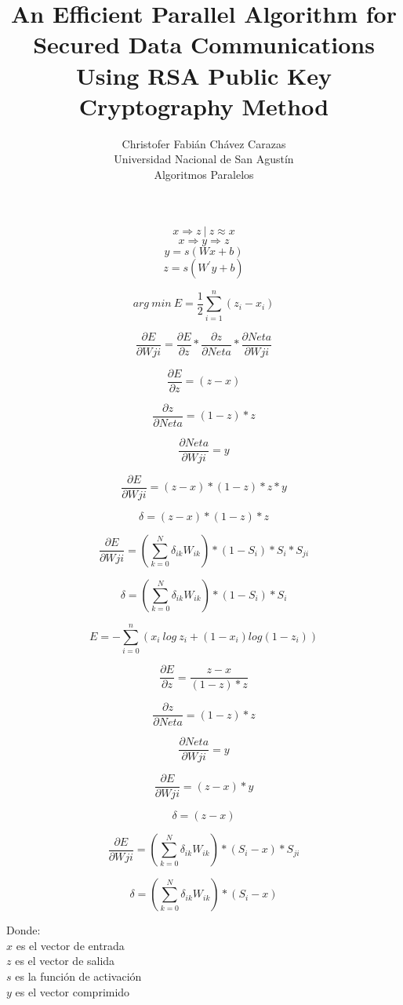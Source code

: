 \documentclass[a4paper,12pt]{article}
\begin{document}
\title{An Efficient Parallel Algorithm for Secured Data Communications Using RSA Public Key Cryptography Method}
\author{
Christofer Fabián Chávez Carazas \\
\small{Universidad Nacional de San Agustín} \\
\small{Algoritmos Paralelos}
}

\maketitle
\begin{Large}
$$x \Rightarrow z \:|\: z \approx x$$
$$x \Rightarrow y \Rightarrow z$$
$$y = s(Wx + b)$$
$$z = s(W^{'}y + b)$$

$$arg\: min\: E = \frac{1}{2}\sum_{i=1}^{n}(z_{i} - x_{i})$$

$$\frac{\partial E}{\partial Wji} = \frac{\partial E}{\partial z} * \frac{\partial z}{\partial Neta} * \frac{\partial Neta}{\partial Wji}$$

$$\frac{\partial E}{\partial z} = (z - x)$$

$$\frac{\partial z}{\partial Neta} = (1 - z) * z$$

$$\frac{\partial Neta}{\partial Wji} = y$$

$$\frac{\partial E}{\partial Wji} = (z-x)*(1-z)*z*y$$

$$\delta = (z-x)*(1-z)*z$$

$$\frac{\partial E}{\partial Wji} = ( \sum_{k=0}^{N} \delta_{ik} W_{ik}) * (1 - S_{i}) * S_{i} * S_{ji}$$

$$\delta = (\sum_{k=0}^{N} \delta_{ik} W_{ik}) * (1 - S_{i}) * S_{i}$$

$$E = - \sum_{i=0}^{n}(x_{i}\:log\:z_{i} + (1 - x_{i})log(1 - z_{i}))$$

$$\frac{\partial E}{\partial z} = \frac{z - x}{(1 - z) * z}$$

$$\frac{\partial z}{\partial Neta} = (1 - z) * z$$

$$\frac{\partial Neta}{\partial Wji} = y$$

$$\frac{\partial E}{\partial Wji} =  (z - x) * y$$

$$\delta = (z - x)$$


$$\frac{\partial E}{\partial Wji} = ( \sum_{k=0}^{N} \delta_{ik} W_{ik}) * (S_{i} - x) * S_{ji}$$

$$\delta = ( \sum_{k=0}^{N} \delta_{ik} W_{ik}) * (S_{i} - x)$$

\end{Large}

Donde:\\
$x$ es el vector de entrada\\
$z$ es el vector de salida\\
$s$ es la función de activación\\
$y$ es el vector comprimido \par
\end{document}
